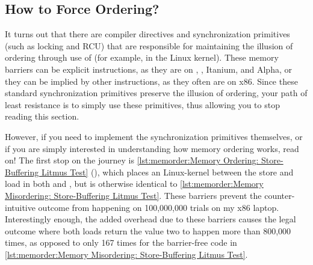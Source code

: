 \subsection{How to Force Ordering?}
\label{sec:memorder:How to Force Ordering?}

It turns out that there are compiler directives and synchronization
primitives (such as locking and RCU) that are responsible for maintaining
the illusion of ordering through use of \emph{} (for
example,  in the Linux kernel).
These memory barriers can be explicit instructions, as they are on
\ARM, \Power{}, Itanium, and Alpha, or they can be implied by other instructions,
as they often are on x86.
Since these standard synchronization primitives preserve the illusion of
ordering, your path of least resistance is to simply use these primitives,
thus allowing you to stop reading this section.

\begin{listing}

\caption{Memory Ordering:
			  Store-Buffering Litmus Test}
\label{lst:memorder:Memory Ordering: Store-Buffering Litmus Test}
\end{listing}

However, if you need to implement the synchronization primitives
themselves, or if you are simply interested in understanding how memory
ordering works, read on!
The first stop on the journey is
\cref{lst:memorder:Memory Ordering: Store-Buffering Litmus Test}
(),
which places an  Linux-kernel  between
the store and load in both  and , but is otherwise
identical to
\cref{lst:memorder:Memory Misordering: Store-Buffering Litmus Test}.
These barriers prevent the counter-intuitive outcome from happening
on 100,000,000 trials on my x86 laptop.
Interestingly enough, the added overhead due to these barriers causes the
legal outcome where both loads return the value two to happen more
than 800,000 times, as opposed to only 167 times for the
barrier-free code in
\cref{lst:memorder:Memory Misordering: Store-Buffering Litmus Test}.

